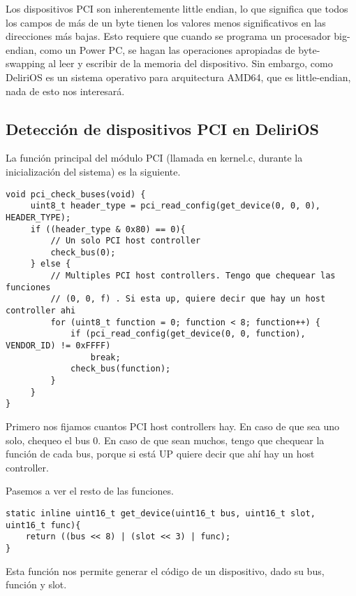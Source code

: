 Los dispositivos PCI son inherentemente little endian, lo que significa que todos los campos de más de un byte tienen los valores menos significativos en las direcciones más bajas. Esto requiere que cuando se programa un procesador big-endian, como un Power PC, se hagan las operaciones apropiadas de byte-swapping al leer y escribir de la memoria del dispositivo. Sin embargo, como DeliriOS es un sistema operativo para arquitectura AMD64, que es little-endian, nada de esto nos interesará.


\subsection{Detección de dispositivos PCI en DeliriOS}

La función principal del módulo PCI (llamada en kernel.c, durante la inicialización del sistema) es la siguiente.

\begin{lstlisting}[style=customcmucho]
void pci_check_buses(void) {
     uint8_t header_type = pci_read_config(get_device(0, 0, 0), HEADER_TYPE);
     if ((header_type & 0x80) == 0){
         // Un solo PCI host controller
         check_bus(0);
     } else {
         // Multiples PCI host controllers. Tengo que chequear las funciones
         // (0, 0, f) . Si esta up, quiere decir que hay un host controller ahi
         for (uint8_t function = 0; function < 8; function++) {
             if (pci_read_config(get_device(0, 0, function), VENDOR_ID) != 0xFFFF)
                 break;
             check_bus(function);
         }
     }
}
\end{lstlisting}

Primero nos fijamos cuantos PCI host controllers hay. En caso de que sea uno solo, chequeo el bus 0. En caso de que sean muchos, tengo que chequear la función de cada bus, porque si está UP quiere decir que ahí hay un host controller.


Pasemos a ver el resto de las funciones. 

\begin{lstlisting}[style=customcmucho]
static inline uint16_t get_device(uint16_t bus, uint16_t slot, uint16_t func){
    return ((bus << 8) | (slot << 3) | func);
}
\end{lstlisting}

Esta función nos permite generar el código de un dispositivo, dado su bus, función y slot.


